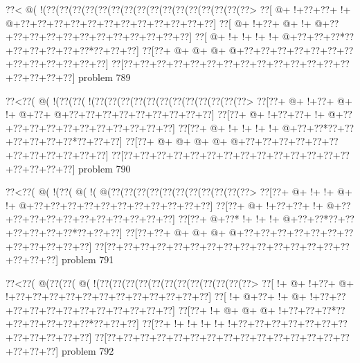 \vbox{\vbox{\goo
\0??<\- @(\- !(\0??(\0??(\0??(\0??(\0??(\0??(\0??(\0??(\0??(\0??(\0??(\0??(\0??(\0??(\0??(\0??>
\0??[\- @+\- !+\0??+\0??+\- !+\- @+\0??+\0??+\0??+\0??+\0??+\0??+\0??+\0??+\0??+\0??+\0??+\0??]
\0??[\- @+\- !+\0??+\- @+\- !+\- @+\0??+\0??+\0??+\0??+\0??+\0??+\0??+\0??+\0??+\0??+\0??+\0??]
\0??[\- @+\- !+\- !+\- !+\- !+\- @+\0??+\0??+\0??*\0??+\0??+\0??+\0??+\0??+\0??*\0??+\0??+\0??]
\0??[\0??+\- @+\- @+\- @+\- @+\0??+\0??+\0??+\0??+\0??+\0??+\0??+\0??+\0??+\0??+\0??+\0??+\0??]
\0??[\0??+\0??+\0??+\0??+\0??+\0??+\0??+\0??+\0??+\0??+\0??+\0??+\0??+\0??+\0??+\0??+\0??+\0??]
}
\hfil problem 789\hfil\break
}



\vbox{\vbox{\goo
\0??<\0??(\- @(\- !(\0??(\0??(\- !(\0??(\0??(\0??(\0??(\0??(\0??(\0??(\0??(\0??(\0??(\0??(\0??>
\0??[\0??+\- @+\- !+\0??+\- @+\- !+\- @+\0??+\- @+\0??+\0??+\0??+\0??+\0??+\0??+\0??+\0??+\0??]
\0??[\0??+\- @+\- !+\0??+\0??+\- !+\- @+\0??+\0??+\0??+\0??+\0??+\0??+\0??+\0??+\0??+\0??+\0??]
\0??[\0??+\- @+\- !+\- !+\- !+\- !+\- @+\0??+\0??*\0??+\0??+\0??+\0??+\0??+\0??*\0??+\0??+\0??]
\0??[\0??+\- @+\- @+\- @+\- @+\- @+\0??+\0??+\0??+\0??+\0??+\0??+\0??+\0??+\0??+\0??+\0??+\0??]
\0??[\0??+\0??+\0??+\0??+\0??+\0??+\0??+\0??+\0??+\0??+\0??+\0??+\0??+\0??+\0??+\0??+\0??+\0??]
}
\hfil problem 790\hfil\break
}



\vbox{\vbox{\goo
\0??<\0??(\- @(\- !(\0??(\- @(\- !(\- @(\0??(\0??(\0??(\0??(\0??(\0??(\0??(\0??(\0??(\0??(\0??>
\0??[\0??+\- @+\- !+\- !+\- @+\- !+\- @+\0??+\0??+\0??+\0??+\0??+\0??+\0??+\0??+\0??+\0??+\0??]
\0??[\0??+\- @+\- !+\0??+\0??+\- !+\- @+\0??+\0??+\0??+\0??+\0??+\0??+\0??+\0??+\0??+\0??+\0??]
\0??[\0??+\- @+\0??*\- !+\- !+\- !+\- @+\0??+\0??*\0??+\0??+\0??+\0??+\0??+\0??*\0??+\0??+\0??]
\0??[\0??+\0??+\- @+\- @+\- @+\- @+\0??+\0??+\0??+\0??+\0??+\0??+\0??+\0??+\0??+\0??+\0??+\0??]
\0??[\0??+\0??+\0??+\0??+\0??+\0??+\0??+\0??+\0??+\0??+\0??+\0??+\0??+\0??+\0??+\0??+\0??+\0??]
}
\hfil problem 791\hfil\break
}



\vbox{\vbox{\goo
\0??<\0??(\- @(\0??(\0??(\- @(\- !(\0??(\0??(\0??(\0??(\0??(\0??(\0??(\0??(\0??(\0??(\0??(\0??>
\0??[\- !+\- @+\- !+\0??+\- @+\- !+\0??+\0??+\0??+\0??+\0??+\0??+\0??+\0??+\0??+\0??+\0??+\0??]
\0??[\- !+\- @+\0??+\- !+\- @+\- !+\0??+\0??+\0??+\0??+\0??+\0??+\0??+\0??+\0??+\0??+\0??+\0??]
\0??[\0??+\- !+\- @+\- @+\- @+\- !+\0??+\0??+\0??*\0??+\0??+\0??+\0??+\0??+\0??*\0??+\0??+\0??]
\0??[\0??+\- !+\- !+\- !+\- !+\- !+\0??+\0??+\0??+\0??+\0??+\0??+\0??+\0??+\0??+\0??+\0??+\0??]
\0??[\0??+\0??+\0??+\0??+\0??+\0??+\0??+\0??+\0??+\0??+\0??+\0??+\0??+\0??+\0??+\0??+\0??+\0??]
}
\hfil problem 792\hfil\break
}



